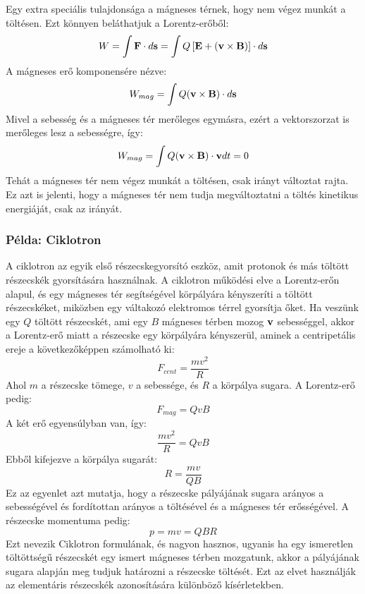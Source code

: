 \documentclass[a4paper,12pt]{article}
\begin{document}
Egy extra speciális tulajdonsága a mágneses térnek, hogy nem végez munkát a töltésen. Ezt könnyen beláthatjuk a Lorentz-erőből:
\begin{equation}
    W = \int \bold{F} \cdot d\bold{s} = \int Q \left[\bold{E} + (\bold{v} \times \bold{B})\right] \cdot d\bold{s}
\end{equation}
A mágneses erő komponensére nézve:
\begin{equation}
    W_{mag} = \int Q (\bold{v} \times \bold{B}) \cdot d\bold{s}
\end{equation}
Mivel a sebesség és a mágneses tér merőleges egymásra, ezért a vektorszorzat is merőleges lesz a sebességre, így:
\begin{equation}
    W_{mag} = \int Q (\bold{v} \times \bold{B}) \cdot \bold{v} dt = 0
\end{equation}
Tehát a mágneses tér nem végez munkát a töltésen, csak irányt változtat rajta. Ez azt is jelenti, hogy a mágneses tér nem tudja megváltoztatni a töltés kinetikus energiáját, csak az irányát.

\subsubsection*{Példa: Ciklotron}
A ciklotron az egyik első részecskegyorsító eszköz, amit protonok és más töltött részecskék gyorsítására használnak. A ciklotron működési elve a Lorentz-erőn alapul, és egy mágneses tér segítségével
körpályára kényszeríti a töltött részecskéket, miközben egy váltakozó elektromos térrel gyorsítja őket. Ha veszünk egy $Q$ töltött részecskét, ami egy $B$ mágneses térben mozog $\bold{v}$ sebességgel, akkor a Lorentz-erő miatt a részecske
egy körpályára kényszerül, aminek a centripetális ereje a következőképpen számolható ki:
\begin{equation}
    F_{cent} = \frac{m v^2}{R}
\end{equation}
Ahol $m$ a részecske tömege, $v$ a sebessége, és $R$ a körpálya sugara. A Lorentz-erő pedig:
\begin{equation}
    F_{mag} = Q v B
\end{equation}
A két erő egyensúlyban van, így:
\begin{equation}
    \frac{m v^2}{R} = Q v B
\end{equation}
Ebből kifejezve a körpálya sugarát:
\begin{equation}
    R = \frac{m v}{Q B}
\end{equation}
Ez az egyenlet azt mutatja, hogy a részecske pályájának sugara arányos a sebességével és fordítottan arányos a töltésével és a mágneses tér erősségével. A részecske momentuma pedig:
\begin{equation}
    p = m v = Q B R
\end{equation}
Ezt nevezik Ciklotron formulának, és nagyon hasznos, ugyanis ha egy ismeretlen töltöttségű részecskét egy ismert mágneses térben mozgatunk, akkor a pályájának sugara alapján meg tudjuk határozni a részecske töltését.
Ezt az elvet használják az elementáris részecskék azonosítására különböző kísérletekben.
\end{document}
